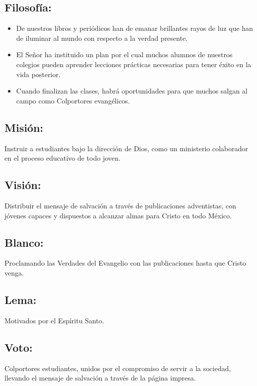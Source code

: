 \documentclass[runningheads]{llncs}
\begin{document}
            \subsection*{Filosofía:}
                \begin{itemize}
                    \item De nuestros libros y periódicos han de emanar brillantes rayos de luz que han de iluminar al mundo con respecto a la verdad presente.
                    \item El Señor ha instituido un plan por el cual muchos alumnos de nuestros colegios pueden aprender lecciones prácticas necesarias para tener éxito en la vida posterior.
                    \item Cuando finalizan las clases, habrá oportunidades para que muchos salgan al campo como Colportores evangélicos.
                \end{itemize}
            \subsection*{Misión: }
                Instruir a estudiantes bajo la dirección de Dios, como un ministerio colaborador en el proceso educativo de todo joven.
            \subsection*{Visión: }
                Distribuir el mensaje de salvación a través de publicaciones adventistas, con jóvenes capaces y dispuestos a alcanzar almas para Cristo en todo México.
            \subsection*{Blanco: }
                Proclamando las Verdades del Evangelio con las publicaciones hasta que Cristo venga.
            \subsection*{Lema: }
                Motivados por el Espíritu Santo.
            \subsection*{Voto:} 
                Colportores estudiantes, unidos por el compromiso de servir a la sociedad, llevando el mensaje de salvación a través de la página impresa.
\end{document}

